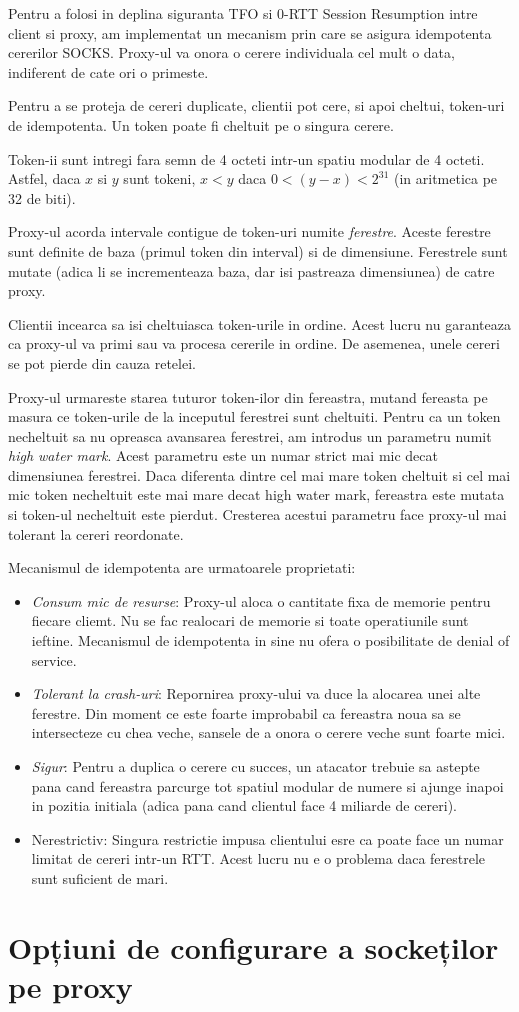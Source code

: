 Pentru a folosi in deplina siguranta TFO si 0-RTT Session Resumption intre client si proxy, am implementat un mecanism
prin care se asigura idempotenta cererilor SOCKS. Proxy-ul va onora o cerere individuala cel mult o data, indiferent de cate
ori o primeste.

Pentru a se proteja de cereri duplicate, clientii pot cere, si apoi cheltui, token-uri de idempotenta. Un token poate fi cheltuit pe o singura cerere.

Token-ii sunt intregi fara semn de 4 octeti intr-un spatiu modular de 4 octeti. Astfel, daca \(x\) si \(y\) sunt tokeni, \(x < y\) daca \( 0 < (y - x) < 2^{31} \) (in aritmetica pe 32 de biti).

Proxy-ul acorda intervale contigue de token-uri numite \emph{ferestre}. Aceste ferestre sunt definite de baza (primul token din interval) si de dimensiune.
Ferestrele sunt mutate (adica li se incrementeaza baza, dar isi pastreaza dimensiunea) de catre proxy.

Clientii incearca sa isi cheltuiasca token-urile in ordine. Acest lucru nu garanteaza ca proxy-ul va primi sau va procesa cererile in ordine. De asemenea, unele cereri se pot pierde din cauza retelei.

Proxy-ul urmareste starea tuturor token-ilor din fereastra, mutand fereasta pe masura ce token-urile de la inceputul ferestrei sunt cheltuiti.
Pentru ca un token necheltuit sa nu opreasca avansarea ferestrei, am introdus un parametru numit \emph{high water mark}. Acest parametru
este un numar strict mai mic decat dimensiunea ferestrei. Daca diferenta dintre cel mai mare token cheltuit si cel mai mic token necheltuit este mai
mare decat high water mark, fereastra este mutata si token-ul necheltuit este pierdut. Cresterea acestui parametru face proxy-ul mai tolerant la cereri reordonate.

Mecanismul de idempotenta are urmatoarele proprietati:
\begin{itemize}
    \item \emph{Consum mic de resurse}: Proxy-ul aloca o cantitate fixa de memorie pentru fiecare cliemt. Nu se fac realocari de memorie si toate operatiunile sunt ieftine.
    Mecanismul de idempotenta in sine nu ofera o posibilitate de denial of service.
    \item \emph{Tolerant la crash-uri}: Repornirea proxy-ului va duce la alocarea unei alte ferestre. Din moment ce este foarte improbabil ca
    fereastra noua sa se intersecteze cu chea veche, sansele de a onora o cerere veche sunt foarte mici.
    \item \emph{Sigur}: Pentru a duplica o cerere cu succes, un atacator trebuie sa astepte pana cand fereastra parcurge tot spatiul modular de numere si ajunge inapoi in pozitia initiala
    (adica pana cand clientul face 4 miliarde de cereri).
    \item {Nerestrictiv}: Singura restrictie impusa clientului esre ca poate face un numar limitat de cereri intr-un RTT. Acest lucru nu e o problema daca ferestrele sunt suficient de mari.
\end{itemize}


\section{Opțiuni de configurare a sockeților pe proxy}

